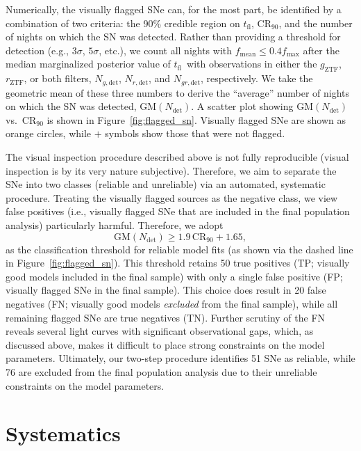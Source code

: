\documentclass[twocolumn]{./aastex63}
\newcommand{\rztf}{$r_\mathrm{ZTF}$}
\newcommand{\gztf}{$g_\mathrm{ZTF}$}
\newcommand{\tfl}{$t_\mathrm{fl}$}
\begin{document}
Numerically, the visually flagged SNe can, for the most part, be identified
by a combination of two criteria: the 90\% credible region on \tfl,
$\mathrm{CR}_{90}$, and the number of nights on which the SN was detected.
Rather than providing a threshold for detection (e.g., $3\sigma$, $5\sigma$,
etc.), we count all nights with $f_\mathrm{mean} \le 0.4 f_\mathrm{max}$
after the median marginalized posterior value of \tfl\ with observations in
either the \gztf, \rztf, or both filters, $N_{g, \mathrm{det}}$, $N_{r,
\mathrm{det}}$, and $N_{gr, \mathrm{det}}$, respectively. We take the
geometric mean of these three numbers to derive the ``average'' number of
nights on which the SN was detected, $\mathrm{GM}(N_\mathrm{det})$. A scatter
plot showing $\mathrm{GM}(N_\mathrm{det})$ vs.\ $\mathrm{CR}_{90}$ is shown
in Figure~\ref{fig:flagged_sn}. Visually flagged SNe are shown as orange
circles, while $+$ symbols show those that were not flagged.

The visual inspection procedure described above is not fully reproducible
(visual inspection is by its very nature subjective). Therefore, we aim to
separate the SNe into two classes (reliable and unreliable) via an automated,
systematic procedure. Treating the visually flagged sources as the negative
class, we view false positives (i.e., visually flagged SNe that are included
in the final population analysis) particularly harmful. Therefore, we adopt
%
$$ \mathrm{GM}(N_\mathrm{det}) \ge 1.9\,\mathrm{CR}_{90} + 1.65,$$
%
as the classification threshold for reliable model fits (as shown via the
dashed line in Figure~\ref{fig:flagged_sn}). This threshold retains 50 true
positives (TP; visually good models included in the final sample) with only a
single false positive (FP; visually flagged SNe in the final sample). This
choice does result in 20 false negatives (FN; visually good models
\textit{excluded} from the final sample), while all remaining flagged SNe are
true negatives (TN). Further scrutiny of the FN reveals several light curves
with significant observational gaps, which, as discussed above, makes it
difficult to place strong constraints on the model parameters. Ultimately, our
two-step procedure identifies 51 SNe as reliable, while 76 are excluded from
the final population analysis due to their unreliable constraints on the model
parameters.

\section{Systematics}\label{sec:systematics}
\end{document}
